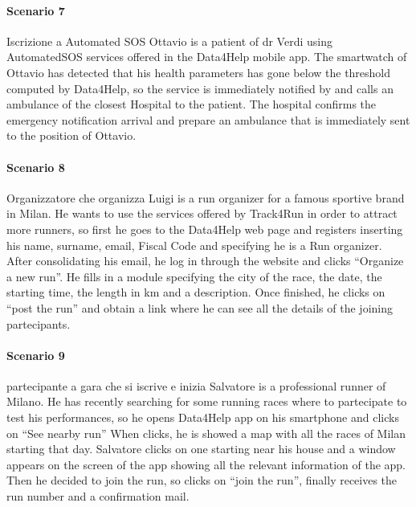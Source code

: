 \paragraph{Scenario 7} Iscrizione a Automated SOS \newline
Ottavio is a patient of dr Verdi using AutomatedSOS services offered in the Data4Help mobile app. The smartwatch of Ottavio has detected that his health parameters has gone below the threshold computed by Data4Help, so the service is immediately notified by and calls an ambulance of the closest Hospital to the patient. The hospital confirms the emergency notification arrival and prepare an ambulance that is immediately sent to the position of Ottavio.


\paragraph{Scenario 8} Organizzatore che organizza \newline
Luigi is a run organizer for a famous sportive brand in Milan. He wants to use the services offered by Track4Run in order to attract more runners, so first he goes to the Data4Help web page and registers inserting his name, surname, email, Fiscal Code and specifying he is a Run organizer. After consolidating his email, he log in through the website and clicks “Organize a new run”. He fills in a module specifying the city of the race, the date, the starting time, the length in km and a description. Once finished, he clicks on “post the run” and obtain a link where he can see all the details of the joining partecipants.



\paragraph{Scenario 9} partecipante a gara  che si iscrive e inizia \newline
Salvatore is a professional runner of Milano.  He has recently searching for some running races where to partecipate to test his performances, so he opens Data4Help app on his smartphone and clicks on “See nearby run”
When clicks, he is showed a map with all the races of Milan starting that day. Salvatore clicks on one starting near his house and a window appears on the screen of the app showing all the relevant information of the app. Then he decided to join the run, so clicks on “join the run”, finally receives the run number and a confirmation mail.



